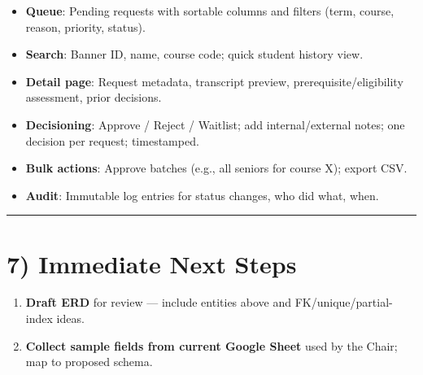 \documentclass[12pt,a4paper]{article}
\begin{document}
\begin{itemize}
  \item \textbf{Queue}: Pending requests with sortable columns and filters (term, course, reason, priority, status).
  \item \textbf{Search}: Banner ID, name, course code; quick student history view.
  \item \textbf{Detail page}: Request metadata, transcript preview, prerequisite/eligibility assessment, prior decisions.
  \item \textbf{Decisioning}: Approve / Reject / Waitlist; add internal/external notes; one decision per request; timestamped.
  \item \textbf{Bulk actions}: Approve batches (e.g., all seniors for course X); export CSV.
  \item \textbf{Audit}: Immutable log entries for status changes, who did what, when.
\end{itemize}

\hrule

\section*{7) Immediate Next Steps}

\begin{enumerate}
  \item \textbf{Draft ERD} for review --- include entities above and FK/unique/partial-index ideas.
  \item \textbf{Collect sample fields from current Google Sheet} used by the Chair; map to proposed schema.
\end{enumerate}
\end{document}
